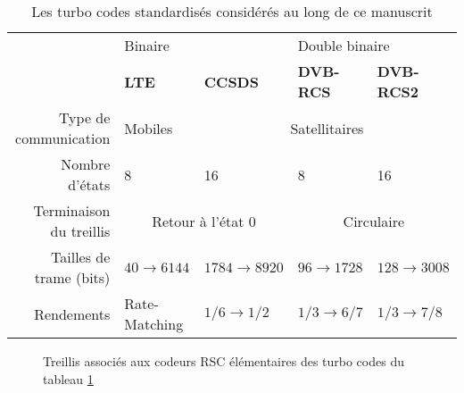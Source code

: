 \begin{table}[h]
	\centering
	\caption{Les turbo codes standardisés considérés au long de ce manuscrit}
	\label{tab:std}
	\begin{tabular}{@{}rllll@{}}
		\toprule
		& \multicolumn{2}{l}{Binaire} & \multicolumn{2}{l}{Double binaire} \\ 
		\cmidrule(l){2-3}\cmidrule(l){4-5}
		                        & \textbf{LTE}          & \textbf{CCSDS}          & \textbf{DVB-RCS}      & \textbf{DVB-RCS2}      \\
		\cmidrule(l){2-2}\cmidrule(l){3-5}%
		Type de communication                  & Mobiles       &  \multicolumn{3}{c}{Satellitaires}                 \\
		\cmidrule(l){2-2}\cmidrule(l){3-3}\cmidrule(l){4-4}\cmidrule(l){5-5}
		Nombre d'états         & 8                     & 16                      & 8                     & 16                     \\
		\cmidrule(l){2-3}\cmidrule(l){4-5}
		Terminaison du treillis    &     \multicolumn{2}{c}{Retour à l'état 0}               &                \multicolumn{2}{c}{Circulaire}                    \\
		\cmidrule(l){2-2}\cmidrule(l){3-3}\cmidrule(l){4-4}\cmidrule(l){5-5}
		Tailles de trame (bits) & $40 \rightarrow 6144$ & $1784 \rightarrow 8920$ & $96 \rightarrow 1728$ & $128 \rightarrow 3008$ \\
		\cmidrule(l){2-2}\cmidrule(l){3-3}\cmidrule(l){4-4}\cmidrule(l){5-5}
		Rendements              & Rate-Matching         & $1/6 \rightarrow 1/2$   & $1/3 \rightarrow 6/7$ & $1/3 \rightarrow 7/8$  \\ \bottomrule
	\end{tabular}
\end{table}

\begin{figure}[h!]
	\begin{center}
																																																																																																																																										
		\caption{Treillis associés aux codeurs RSC élémentaires des turbo codes du tableau \ref{tab:std}}
		\label{fig:treillisstd}
	\end{center}
\end{figure}

